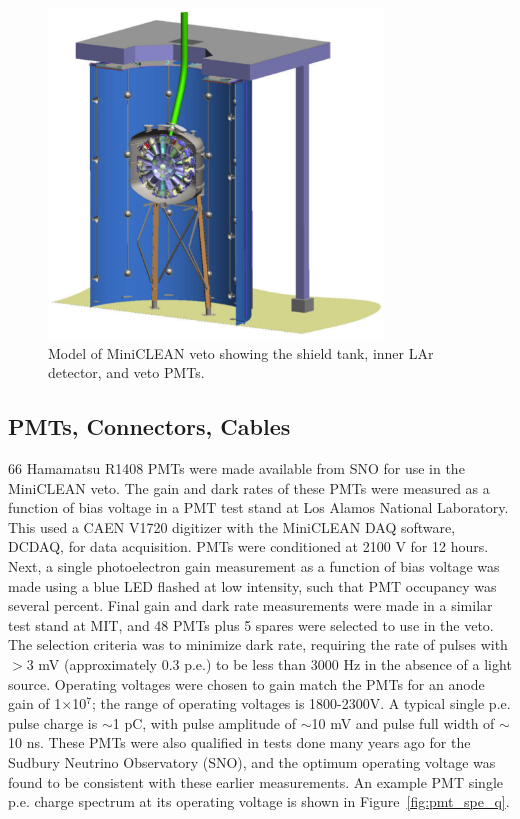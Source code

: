 \documentclass{JINST}
\begin{document}
\begin{figure}[ht]
\begin{center}
\includegraphics[width=3.5in]{graphics/miniclean_overview_drawing.pdf}
\caption{Model of MiniCLEAN veto showing the shield tank, inner LAr detector, and veto PMTs.
\label{fig:veto_geom}}
\end{center}
\end{figure}

\subsection{PMTs, Connectors, Cables}
\label{sec:pmts}
%
66 Hamamatsu R1408 PMTs were made available from SNO for use in the MiniCLEAN
veto. The gain and dark rates of these PMTs were measured as a
function of bias voltage in a PMT test stand at Los Alamos National
Laboratory.  This used a CAEN V1720 digitizer with the MiniCLEAN DAQ
software, DCDAQ, for data acquisition. PMTs were conditioned at 2100 V
for 12 hours. Next, a single photoelectron gain measurement as a
function of bias voltage was made using a blue LED flashed at low
intensity, such that PMT occupancy was several percent. Final gain and
dark rate measurements were made in a similar test stand at MIT, and
48 PMTs plus 5 spares were selected to use in the veto.  The selection
criteria was to minimize dark rate, requiring the rate of pulses with
$>$3 mV (approximately 0.3 p.e.) to be less than 3000 Hz in the
absence of a light source.  Operating voltages were chosen to gain
match the PMTs for an anode gain of 1$\times$10$^7$; the range of
operating voltages is 1800-2300V.  A typical single p.e. pulse charge
is $\sim$1 pC, with pulse amplitude of $\sim$10 mV and pulse full width of
$\sim$10 ns.  These PMTs were also qualified in tests done many years ago for
the Sudbury Neutrino Observatory (SNO), and the optimum operating voltage was
found to be consistent with these earlier measurements.
An example PMT single p.e. charge spectrum at its operating voltage is
shown in Figure~\ref{fig:pmt_spe_q}.
\end{document}
